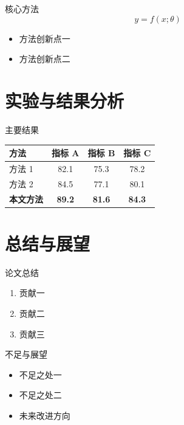 \documentclass[
    aspectratio=169,
    fontset=windows,
]{ctexbeamer}
\begin{document}
\begin{frame}{核心方法}
  \begin{equation}
    y = f(x; \theta)
  \end{equation}

  \begin{itemize}
    \item 方法创新点一
    \item 方法创新点二
  \end{itemize}
\end{frame}

\section{实验与结果分析}

\begin{frame}{主要结果}
  \begin{table}
    \centering
    \begin{tabular}{lccc}
      \toprule
      \textbf{方法} & \textbf{指标 A} & \textbf{指标 B} & \textbf{指标 C} \\
      \midrule
      方法 1 & 82.1 & 75.3 & 78.2 \\
      方法 2 & 84.5 & 77.1 & 80.1 \\
      \textbf{本文方法} & \textbf{89.2} & \textbf{81.6} & \textbf{84.3} \\
      \bottomrule
    \end{tabular}
  \end{table}
\end{frame}

\section{总结与展望}

\begin{frame}{论文总结}
  \begin{enumerate}
    \item 贡献一
    \item 贡献二
    \item 贡献三
  \end{enumerate}
\end{frame}

\begin{frame}{不足与展望}
  \begin{itemize}
    \item 不足之处一
    \item 不足之处二
    \item 未来改进方向
  \end{itemize}
\end{frame}

\maketitle
\end{document}
